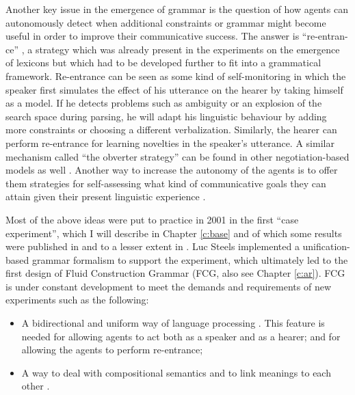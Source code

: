 Another key issue in the emergence of grammar is the question of how agents can autonomously detect when additional constraints or grammar might become useful in order to improve their communicative success. The answer is ``re-entran-ce'' \citep{steels03language}, a strategy which was already present in the experiments on the emergence of lexicons but which had to be developed further to fit into a grammatical framework. Re-entrance can be seen as some kind of self-monitoring in which the speaker first simulates the effect of his utterance on the hearer by taking himself as a model. If he detects problems such as ambiguity or an explosion of the search space during parsing, he will adapt his linguistic behaviour by adding more constraints or choosing a different verbalization. Similarly, the hearer can perform re-entrance for learning novelties in the speaker's utterance. A similar mechanism called ``the obverter strategy'' can be found in other negotiation-based models as well \citep{smith03intelligent}. Another way to increase the autonomy of the agents is to offer them strategies for self-assessing what kind of communicative goals they can attain given their present linguistic experience \citep[called the ``autotelic principle'',][]{steels04architecture, steels04autotelic, steels07scaffolding}.

Most of the above ideas were put to practice in 2001 in the first ``case experiment'', which I will describe in Chapter \ref{c:base} and of which some results were published in \citet{steels04constructivist} and to a lesser extent in \citet{steels03language, steels07recruitment}. Luc Steels implemented a unification-based grammar formalism to support the experiment, which ultimately led to the first design of Fluid Construction Grammar (FCG, also see Chapter \ref{c:ar}). FCG is under constant development to meet the demands and requirements of new experiments such as the following:

\largerpage
\begin{itemize}
\item A bidirectional and uniform way of language processing \citep{steels06unify}. This feature is needed for allowing agents to act both as a speaker and as a hearer; and for allowing the agents to perform re-entrance;
\item A way to deal with compositional semantics and to link meanings to each other \citep{steels05linking}.
\end{itemize}

